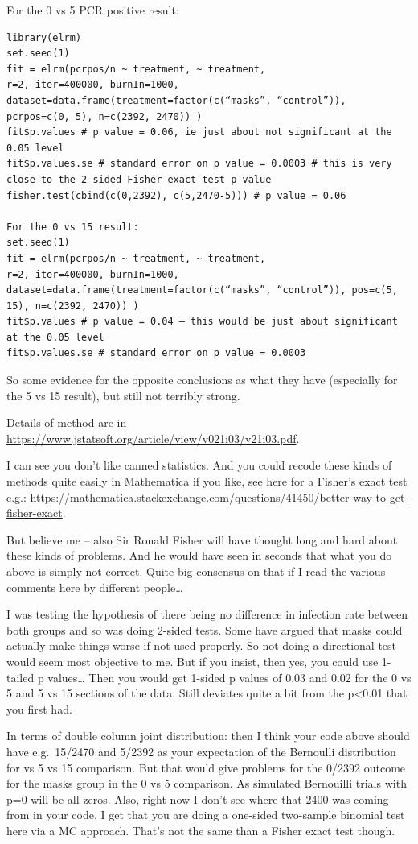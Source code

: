 \documentclass[
]{book}
\begin{document}
For the 0 vs 5 PCR positive result:

\begin{verbatim}
library(elrm)
set.seed(1)
fit = elrm(pcrpos/n ~ treatment, ~ treatment,
r=2, iter=400000, burnIn=1000,
dataset=data.frame(treatment=factor(c(“masks”, “control”)), pcrpos=c(0, 5), n=c(2392, 2470)) )
fit$p.values # p value = 0.06, ie just about not significant at the 0.05 level
fit$p.values.se # standard error on p value = 0.0003 # this is very close to the 2-sided Fisher exact test p value
fisher.test(cbind(c(0,2392), c(5,2470-5))) # p value = 0.06

For the 0 vs 15 result:
set.seed(1)
fit = elrm(pcrpos/n ~ treatment, ~ treatment,
r=2, iter=400000, burnIn=1000,
dataset=data.frame(treatment=factor(c(“masks”, “control”)), pos=c(5, 15), n=c(2392, 2470)) )
fit$p.values # p value = 0.04 – this would be just about significant at the 0.05 level
fit$p.values.se # standard error on p value = 0.0003
\end{verbatim}

So some evidence for the opposite conclusions as what they have (especially for the 5 vs 15 result), but still not terribly strong.

Details of method are in \url{https://www.jstatsoft.org/article/view/v021i03/v21i03.pdf}.

I can see you don't like canned statistics. And you could recode these kinds of methods quite easily in Mathematica if you like, see here for a Fisher's exact test e.g.:
\url{https://mathematica.stackexchange.com/questions/41450/better-way-to-get-fisher-exact}.

But believe me -- also Sir Ronald Fisher will have thought long and hard about these kinds of problems. And he would have seen in seconds that what you do above is simply not correct. Quite big consensus on that if I read the various comments here by different people\ldots{}

I was testing the hypothesis of there being no difference in infection rate between both groups and so was doing 2-sided tests. Some have argued that masks could actually make things worse if not used properly. So not doing a directional test would seem most objective to me. But if you insist, then yes, you could use 1-tailed p values\ldots{} Then you would get 1-sided p values of 0.03 and 0.02 for the 0 vs 5 and 5 vs 15 sections of the data. Still deviates quite a bit from the p\textless0.01 that you first had.

In terms of double column joint distribution: then I think your code above should have e.g.~15/2470 and 5/2392 as your expectation of the Bernoulli distribution for vs 5 vs 15 comparison. But that would give problems for the 0/2392 outcome for the masks group in the 0 vs 5 comparison. As simulated Bernouilli trials with p=0 will be all zeros. Also, right now I don't see where that 2400 was coming from in your code. I get that you are doing a one-sided two-sample binomial test here via a MC approach. That's not the same than a Fisher exact test though.
\end{document}
